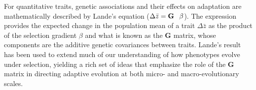 \documentclass[11pt,twocolumn]{article}
\newcommand{\G}{\textbf{G }}
\begin{document}
% 
% 
% 
% 

For quantitative traits, genetic associations and their effects on adaptation are mathematically described by Lande's equation ($\Delta \bar{z} = \G \hspace{.05in}\beta$). The expression provides the expected change in the population mean of a trait $\Delta \bar{z}$ as the product of the selection gradient $\beta$ and what is known as the \G  matrix, whose components are the additive genetic covariances between traits. Lande’s result has been used to extend much of our understanding of how phenotypes evolve under selection, yielding a rich set of ideas that emphasize the role of the \G  matrix in directing adaptive evolution at both micro- and macro-evolutionary scales.\par
% 
% 
\end{document}
